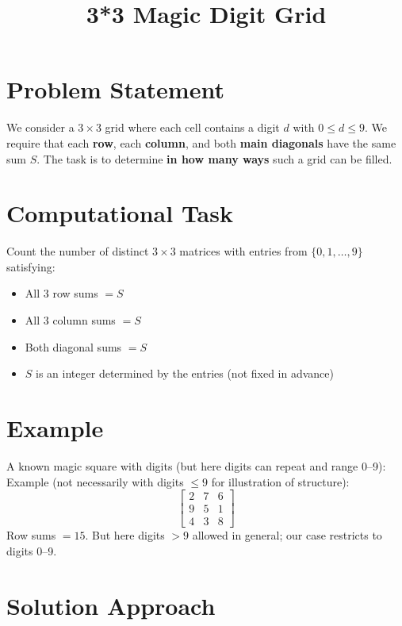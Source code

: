 \documentclass[12pt]{article}
\title{3*3 Magic Digit Grid}
\author{}
\date{}
\begin{document}
\maketitle

\section*{Problem Statement}

We consider a $3 \times 3$ grid where each cell contains a digit $d$ with $0 \leq d \leq 9$.  
We require that each \textbf{row}, each \textbf{column}, and both \textbf{main diagonals} have the same sum $S$.  
The task is to determine \textbf{in how many ways} such a grid can be filled.

\section*{Computational Task}

Count the number of distinct $3 \times 3$ matrices with entries from $\{0,1,\dots,9\}$ satisfying:
\begin{itemize}
    \item All 3 row sums $= S$
    \item All 3 column sums $= S$
    \item Both diagonal sums $= S$
    \item $S$ is an integer determined by the entries (not fixed in advance)
\end{itemize}

\section*{Example}

A known magic square with digits (but here digits can repeat and range 0--9):  
Example (not necessarily with digits $\leq 9$ for illustration of structure):
\[
\begin{bmatrix}
2 & 7 & 6 \\
9 & 5 & 1 \\
4 & 3 & 8
\end{bmatrix}
\]
Row sums $= 15$. But here digits $>9$ allowed in general; our case restricts to digits 0--9.

\section*{Solution Approach}
\end{document}
